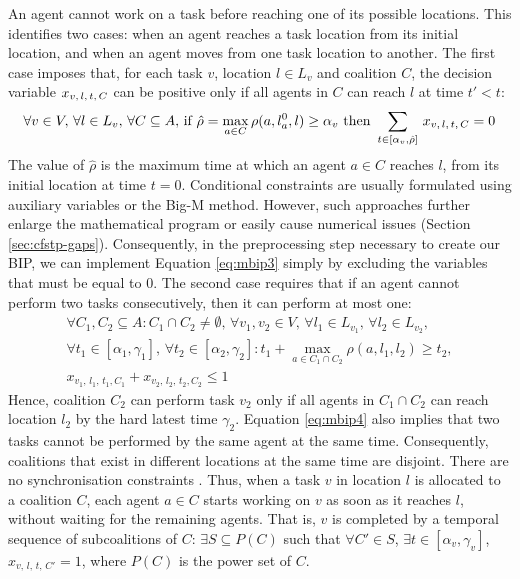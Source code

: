 An agent cannot work on a task before reaching one of its possible locations. This
identifies two cases: when an agent reaches a task location from its initial location, and
when an agent moves from one task location to another. The first case imposes that, for
each task $v$, location $l \in L_v$ and coalition $C$, the decision variable $x_{v,\, l,\, t,\, C}$ can be
positive only if all agents in $C$ can reach $l$ at time $t' < t$:
\begin{equation}\label{eq:mbip3}
    \forall v \in V,\, \forall l \in L_v,\, \forall C \subseteq A,\,
    \text{if } \hat{\rho} = \max_{a \in C} \rho(a, l_a^0, l) \geq \alpha_v
    \text{ then }
    \sum_{t \in [\alpha_v, \hat{\rho}]}\, x_{v,\, l,\, t,\, C} = 0
\end{equation}
The value of $\hat{\rho}$ is the maximum time at which an agent $a \in C$ reaches $l$,
from its initial location at time $t = 0$. Conditional constraints are usually formulated
using auxiliary variables or the Big-M method. However, such approaches further enlarge
the mathematical program or easily cause numerical issues (Section \ref{sec:cfstp-gaps}).
Consequently, in the preprocessing step necessary to create our BIP, we can implement
Equation \ref{eq:mbip3} simply by excluding the variables that must be equal to $0$.
The second case requires that if an agent cannot perform two tasks consecutively, then it
can perform at most one:
\begin{equation}\label{eq:mbip4}
    \begin{gathered}
    \forall C_1, C_2 \subseteq A : C_1 \cap C_2 \neq \emptyset,\,
    \forall v_1, v_2 \in V,\, \forall l_1 \in L_{v_1},\, \forall l_2 \in L_{v_2},\\
    \forall t_1 \in [\alpha_1, \gamma_1],\, \forall t_2 \in [\alpha_2, \gamma_2] :
    t_1 + \max_{a \in C_1 \cap C_2} \rho(a, l_1, l_2) \geq t_2,\\
    x_{v_1,\, l_1,\, t_1, C_1} + x_{v_2,\, l_2,\, t_2, C_2} \leq 1
    \end{gathered}
\end{equation}
Hence, coalition $C_2$ can perform task $v_2$ only if all agents in $C_1 \cap C_2$ can
reach location $l_2$ by the hard latest time $\gamma_2$. Equation \ref{eq:mbip4} also
implies that two tasks cannot be performed by the same agent at the same time.
Consequently, coalitions that exist in different locations at the same time are disjoint.
There are no synchronisation constraints \cite{nunes2017taxonomy}. Thus, when a task $v$
in location $l$ is allocated to a coalition $C$, each agent $a \in C$ starts working on
$v$ as soon as it reaches $l$, without waiting for the remaining agents. That is, $v$ is
completed by a temporal sequence of subcoalitions of $C$: $\exists S \subseteq P(C)$ such
that $\forall C' \in S$, $\exists t \in [\alpha_v, \gamma_v]$, $x_{v,\, l,\, t,\, C'} =
1$, where $P(C)$ is the power set of $C$.

